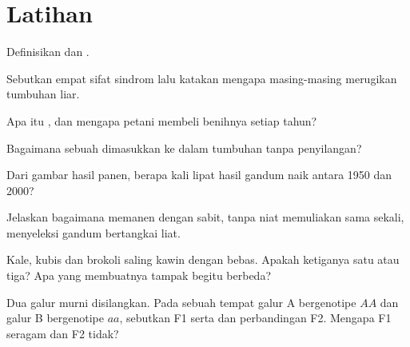 \section{Latihan}

\begin{exercise}[$\star$]\label{exo:g12:domesticated-plants:1}
Definisikan  dan .
\end{exercise}

\begin{exercise}[$\star$]\label{exo:g12:domesticated-plants:2}
Sebutkan empat sifat sindrom  lalu katakan mengapa
masing-masing merugikan tumbuhan liar.
\end{exercise}

\begin{exercise}[$\star$]\label{exo:g12:domesticated-plants:3}
Apa itu , dan mengapa petani membeli benihnya setiap tahun?
\end{exercise}

\begin{exercise}[$\star$]\label{exo:g12:domesticated-plants:4}
Bagaimana sebuah  dimasukkan ke dalam tumbuhan tanpa penyilangan?
\end{exercise}

\begin{exercise}[$\star$]\label{exo:g12:domesticated-plants:5}
Dari gambar hasil panen, berapa kali lipat hasil gandum naik antara
1950 dan 2000?
\end{exercise}

\begin{exercise}[$\star\star$]\label{exo:g12:domesticated-plants:6}
Jelaskan bagaimana memanen dengan sabit, tanpa niat memuliakan sama
sekali, menyeleksi gandum bertangkai liat.
\end{exercise}

\begin{exercise}[$\star\star$]\label{exo:g12:domesticated-plants:7}
Kale, kubis dan brokoli saling kawin dengan bebas. Apakah ketiganya
satu  atau tiga? Apa yang membuatnya tampak begitu berbeda?
\end{exercise}

\begin{exercise}[$\star\star$]\label{exo:g12:domesticated-plants:8}
Dua galur murni disilangkan. Pada sebuah  tempat galur A bergenotipe $AA$
dan galur B bergenotipe $aa$, sebutkan  F1 serta  dan
perbandingan F2. Mengapa F1 seragam dan F2 tidak?
\end{exercise}

